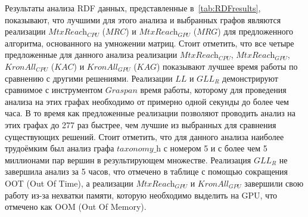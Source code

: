 Результаты анализа RDF данных, представленные в~\cref{tab:RDFresults}, показывают, что лучшими для этого анализа и выбранных графов являются реализации $\textit{MtxReach}_{\textit{CPU}}$ ($\textit{MRC}$) и $\textit{MtxReach}_{\textit{GPU}}$ ($\textit{MRG}$) для предложенного алгоритма, основанного на умножении матриц. Стоит отметить, что все четыре предложенные для данного анализа реализации $\textit{MtxReach}_{\textit{CPU}}$, $\textit{MtxReach}_{\textit{GPU}}$, $\textit{KronAll}_{\textit{CPU}}$ ($\textit{KAC}$) и $\textit{KronAll}_{\textit{GPU}}$ ($\textit{KAG}$) показывают лучшее время работы по сравнению с другими решениями. Реализации $\textit{LL}$ и $\textit{GLL}_{\textit{R}}$ демонстрируют сравнимое с инструментом $\textit{Graspan}$ время работы, которому для проведения анализа на этих графах необходимо от примерно одной секунды до более чем часа. В то время как предложенные реализации позволяют проводить анализ на этих графах до 277 раз быстрее, чем лучшие из выбранных для сравнения существующих решений. Стоит отметить, что для данного анализа наиболее трудоёмким был анализ графа $\textit{taxonomy\_h}$ с номером 5 и с более чем 5 миллионами пар вершин в результирующем множестве. Реализация $\textit{GLL}_{\textit{R}}$ не завершила анализ за 5 часов, что отмечено в таблице с помощью сокращения OOT (Out Of Time), а реализации $\textit{MtxReach}_{\textit{GPU}}$ и $\textit{KronAll}_{\textit{GPU}}$ завершили свою работу из-за нехватки памяти, которую необходимо выделить на GPU, что отмечено как OOM (Out Of Memory).

